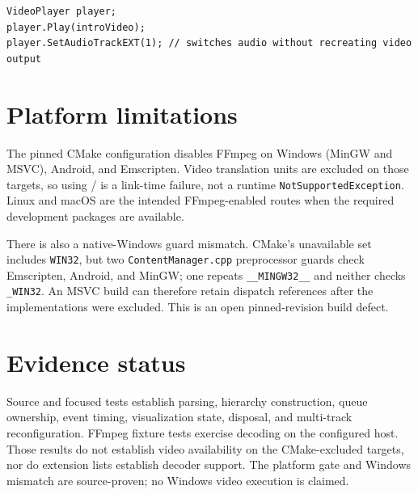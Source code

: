 \begin{lstlisting}
VideoPlayer player;
player.Play(introVideo);
player.SetAudioTrackEXT(1); // switches audio without recreating video output
\end{lstlisting}

\section{Platform limitations}

The pinned CMake configuration disables FFmpeg on Windows (MinGW and MSVC), Android, and
Emscripten. Video translation units are excluded on those targets, so using
/ is a link-time failure, not a runtime
\texttt{NotSupportedException}. Linux and macOS are the intended FFmpeg-enabled routes when
the required development packages are available.

There is also a native-Windows guard mismatch. CMake's unavailable set includes \texttt{WIN32},
but two \texttt{ContentManager.cpp} preprocessor guards check Emscripten, Android, and MinGW;
one repeats \texttt{\_\_MINGW32\_\_} and neither checks \texttt{\_WIN32}. An MSVC build can
therefore retain  dispatch references after the implementations were excluded.
This is an open pinned-revision build defect.

\section{Evidence status}

Source and focused tests establish parsing, hierarchy construction, queue ownership, event
timing, visualization state, disposal, and multi-track reconfiguration. FFmpeg fixture tests
exercise decoding on the configured host. Those results do not establish video availability on
the CMake-excluded targets, nor do extension lists establish decoder support. The platform gate
and Windows mismatch are source-proven; no Windows video execution is claimed.
